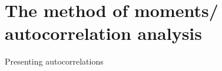 \documentclass[12pt]{article}
\newcommand{\1}{\mathbf{1}}
\theoremstyle{plain}
\theoremstyle{definition}
\theoremstyle{remark}
\theoremstyle{plain}
\theoremstyle{remark}
\theoremstyle{plain}
\theoremstyle{plain}
\begin{document}
\section{The method of moments/ autocorrelation analysis} \label{sec:AC_analysis}

Presenting autocorrelations

%
%
\end{document}
